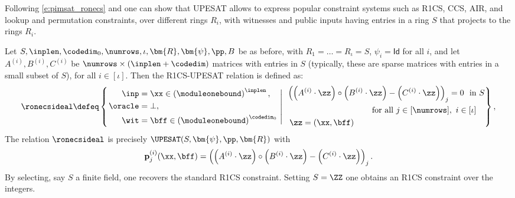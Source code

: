 

Following  \cref{e:pimsat_ronecs} and \cite{linear-accumulation,zinc,zincplus} one can  show that UPESAT allows to express  popular constraint systems such as R1CS, CCS, AIR, and lookup and permutation constraints, over different rings $R_i$, with witnesses and public inputs having entries in a ring $S$ that projects to the rings $R_i$.


\begin{example}\label{e:pimsat_ronecs}
Let $S,\inplen,\codedim_0,\numrows,\iota, \bm{R}, \bm{\psi}, \pp, B$ be as before,  with $R_1=\ldots = R_\iota=S$, $\psi_i=\mathsf{Id}$ for all $i$, and let $A^{(i)},B^{(i)},C^{(i)}$ be $\numrows \times (\inplen+\codedim)$ matrices with entries in $S$ (typically, these are sparse matrices with entries in a small subset of $S$), for all $i\in [\iota]$. Then the R1CS-UPESAT relation is defined as:
    $$
\ronecsideal \defeq \left\{\left. 
\begin{aligned}
    \inp &= \xx\in \left(\moduleonebound\right)^{\inplen},\\
    \oracle &= \bot,\\
    \wit &=\bff \in \left(\moduleonebound\right)^{\codedim_0}
\end{aligned} 
\ \right| \ 
\begin{aligned}
 &\left(\left(A^{(i)}\cdot \zz\right)\circ \left(B^{(i)}\cdot \zz\right) - \left(C^{(i)}\cdot \zz\right)\right)_{j} = 0 \ \text{ in } S \\ &\qquad\qquad \qquad \qquad \qquad \text{ for all } j\in [\numrows], \ i \in [\iota]\\
    &\ \zz=(\xx, \bff)
\end{aligned}
\right\},
$$
The relation $\ronecsideal$ is  precisely $\UPESAT(S,\bm{\psi}, \pp,\bm{R})$ with $$\mathbf{p}_{j}^{(i)}(\xx,\bff)= \left(\left(A^{(i)}\cdot \zz\right)\circ \left(B^{(i)}\cdot \zz\right) - \left(C^{(i)}\cdot \zz\right)\right)_{j}.$$
By selecting, say $S$ a finite field, one recovers the standard R1CS constraint. Setting $S=\ZZ$ one obtains an R1CS constraint over the integers.
\end{example}
%



